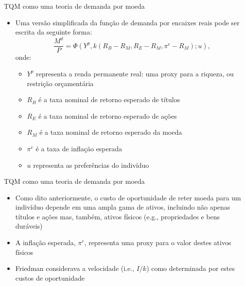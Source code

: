 \documentclass[10pt]{beamer}
\begin{document}
\begin{frame}{TQM como uma teoria de demanda por moeda}
    \begin{itemize}
        \item Uma versão simplificada da função de demanda por encaixes reais pode ser escrita da seguinte forma:
        \begin{equation}
            \frac{M^d}{P} = \Phi\left(Y^p, k(R_B - R_M, R_E-R_M, \pi^e-R_M); u\right),
            \label{eq1}
        \end{equation}
        onde:
        \begin{itemize}
            \item $Y^p$ representa a renda permanente real: uma proxy para a riqueza, ou restrição orçamentária
            \medskip
            \item $R_B$ é a taxa nominal de retorno esperado de títulos
            \medskip
            \item $R_E$ é a taxa nominal de retorno esperado de ações
            \medskip
            \item $R_M$ é a taxa nominal de retorno esperado da moeda
            \medskip
            \item $\pi^e$ é a taxa de inflação esperada
            \medskip
            \item $u$ representa as preferências do indivíduo
        \end{itemize}
    \end{itemize}
\end{frame}

\begin{frame}{TQM como uma teoria de demanda por moeda}
    \begin{itemize}
        \item Como dito anteriormente, o custo de oportunidade de reter moeda para um indivíduo depende em uma ampla gama de ativos, incluindo não apenas títulos e ações mas, também, ativos físicos (e.g., propriedades e bens duráveis)
        \bigskip
        \item A inflação esperada, $\pi^e$, representa uma proxy para o valor destes ativos físicos
        \bigskip
        \item Friedman considerava a velocidade (i.e., $I/k$) como determinada por estes custos de oportunidade
    \end{itemize}
\end{frame}
\end{document}
